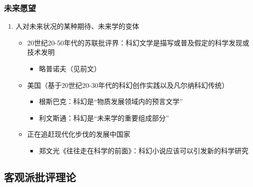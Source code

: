 \documentclass{ctexart}
\begin{document}
\subsubsection{未来愿望}

\begin{enumerate}
    \item 人对未来状况的某种期待、未来学的变体
        \begin{itemize}
            \item 20世纪20-50年代的苏联批评界：科幻文学是描写或普及假定的科学发现或技术发明
            \begin{itemize}
                \item 略普诺夫（见前文）
            \end{itemize}
            \item 美国（基于20世纪20-30年代的科幻创作实践以及凡尔纳科幻传统）
            \begin{itemize}
                \item 根斯巴克：科幻是“物质发展领域内的预言文学”
                \item 利文斯通：科幻是“未来学的重要组成部分”
            \end{itemize}
            \item 正在追赶现代化步伐的发展中国家
            \begin{itemize}
                \item 郑文光《往往走在科学的前面》：科幻小说应该可以引发新的科学研究
            \end{itemize}
        \end{itemize}
\end{enumerate}


\subsection{客观派批评理论}
\end{document}
